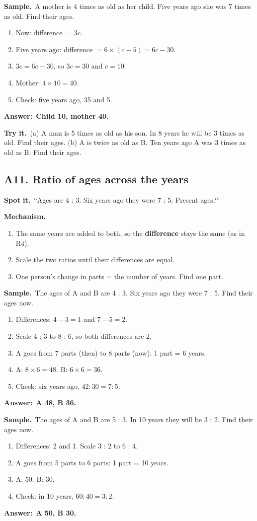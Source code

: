 \documentclass[11pt,a4paper]{article}
\let\oldsubsection\subsection
\renewcommand{\subsection}{\needspace{9\baselineskip}\oldsubsection}
\newcommand{\spot}{\textbf{\color{ember}Spot it.}\ }
\newcommand{\mech}{\textbf{\color{ember}Mechanism.}\ }
\newif\ifkeepsamp
\newcommand{\ans}[1]{\par\nopagebreak\noindent\textbf{\color{ember}Answer:}\ \textbf{#1}\par}
\newcommand{\samp}{\ifkeepsamp\needspace{4\baselineskip}\fi\textbf{\color{ember}Sample.}\ }
\newcommand{\tryit}[1]{\textbf{\color{ember}Try it.}\ #1}
\begin{document}
\samp A mother is 4 times as old as her child. Five years ago she was 7 times as old. Find their ages.
\begin{enumerate}
\item Now: difference $= 3c$.
\item Five years ago: difference $= 6 \times (c - 5) = 6c - 30$.
\item $3c = 6c - 30$, so $3c = 30$ and $c = 10$.
\item Mother: $4 \times 10 = 40$.
\item Check: five years ago, 35 and 5.
\end{enumerate}
\ans{Child 10, mother 40.}

\tryit (a) A man is 5 times as old as his son. In 8 years he will be 3 times as old. Find their ages. (b) A is twice as old as B. Ten years ago A was 3 times as old as B. Find their ages.

\subsection{A11. Ratio of ages across the years}
\spot ``Ages are 4 : 3. Six years ago they were 7 : 5. Present ages?''

\mech
\begin{enumerate}
\item The same years are added to both, so the \textbf{difference} stays the same (as in R4).
\item Scale the two ratios until their differences are equal.
\item One person's change in parts = the number of years. Find one part.
\end{enumerate}

\samp The ages of A and B are 4 : 3. Six years ago they were 7 : 5. Find their ages now.
\begin{enumerate}
\item Differences: $4 - 3 = 1$ and $7 - 5 = 2$.
\item Scale 4 : 3 to 8 : 6, so both differences are 2.
\item A goes from 7 parts (then) to 8 parts (now): 1 part = 6 years.
\item A: $8 \times 6 = 48$. B: $6 \times 6 = 36$.
\item Check: six years ago, $42 : 30 = 7 : 5$.
\end{enumerate}
\ans{A 48, B 36.}

\samp The ages of A and B are 5 : 3. In 10 years they will be 3 : 2. Find their ages now.
\begin{enumerate}
\item Differences: 2 and 1. Scale 3 : 2 to 6 : 4.
\item A goes from 5 parts to 6 parts: 1 part = 10 years.
\item A: 50. B: 30.
\item Check: in 10 years, $60 : 40 = 3 : 2$.
\end{enumerate}
\ans{A 50, B 30.}
\end{document}
